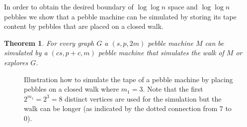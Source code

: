\documentclass[draft,oneside]{scrartcl}
\newtheorem{thm}{Theorem}
\begin{document}
In order to obtain the desired boundary of $\log\log n$ space and $\log\log n$
pebbles we show that a pebble machine can be simulated by storing its tape
content by pebbles that are placed on a closed walk.
\begin{thm}
  \label{thm:simulation}
  For every graph $G$ a $(s,p,2m)$ pebble machine $M$ can be simulated by
  a $(cs,p + c,m)$ pebble machine that simulates the walk of $M$ or explores
  $G$.
\end{thm}
\begin{figure}
  \caption{Illustration how to simulate the tape of a pebble machine by
  placing pebbles on a closed walk where $m_{1} = 3$. Note that the first
  $2^{m_{1}}=2^{3}=8$ distinct vertices are used for the simulation but the
  walk can be longer (as indicated by the dotted connection from $7$ to $0$).}
  \label{fig:tapesim}
  \begin{center}
    \resizebox{0.6\textwidth}{!}{}
  \end{center}
\end{figure}
\end{document}
